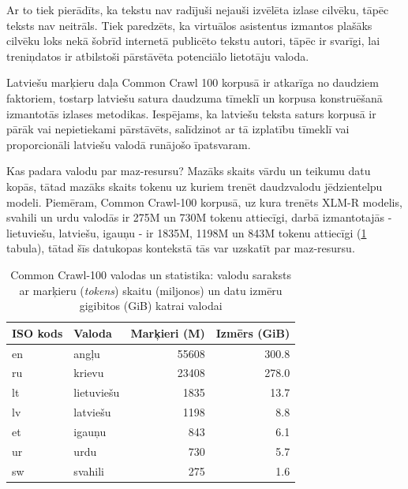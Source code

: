 Ar to tiek pierādīts, ka tekstu nav radījuši nejauši izvēlēta izlase cilvēku, tāpēc teksts nav neitrāls. Tiek paredzēts, ka virtuālos asistentus izmantos plašāks cilvēku loks nekā šobrīd internetā publicēto tekstu autori, tāpēc ir svarīgi, lai treniņdatos ir atbilstoši pārstāvēta potenciālo lietotāju valoda. 


Latviešu marķieru daļa Common Crawl 100 korpusā ir atkarīga no daudziem faktoriem, tostarp latviešu satura daudzuma tīmeklī un korpusa konstruēšanā izmantotās izlases metodikas. Iespējams, ka latviešu teksta saturs korpusā ir pārāk vai nepietiekami pārstāvēts, salīdzinot ar tā izplatību tīmeklī vai proporcionāli latviešu valodā runājošo īpatsvaram.


Kas padara valodu par maz-resursu? Mazāks skaits vārdu un teikumu datu kopās, tātad mazāks skaits tokenu uz kuriem trenēt daudzvalodu jēdzientelpu modeli. Piemēram, Common Crawl-100 korpusā, uz kura trenēts XLM-R modelis, svahili un urdu valodās ir 275M un 730M tokenu attiecīgi, darbā izmantotajās - lietuviešu, latviešu, igauņu - ir 1835M, 1198M un 843M tokenu attiecīgi (\ref{tab:cc-100} tabula), tātad šīs datukopas kontekstā tās var uzskatīt par maz-resursu. 


\begin{table}[htbp]
  \centering
  \caption{Common Crawl-100 valodas un statistika: valodu saraksts ar marķieru (\textit{tokens}) skaitu (miljonos) un datu izmēru gigibitos (GiB) katrai valodai}
    \begin{tabular}{llrr} \toprule
    ISO kods &  Valoda & Marķieri (M) & Izmērs (GiB) \\\midrule
    en    &  angļu & 55608 & 300.8 \\
    ru    &  krievu & 23408 & 278.0 \\
    lt    &  lietuviešu & 1835  & 13.7 \\
    lv    &  latviešu & 1198  & 8.8 \\
    et    &  igauņu & 843   & 6.1 \\
    ur    &  urdu & 730   & 5.7 \\
    sw    &  svahili & 275   & 1.6 \\\bottomrule
    \end{tabular}
  \label{tab:cc-100}
\end{table}
